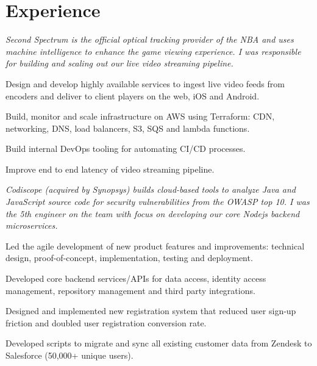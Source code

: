\documentclass[letterpaper]{deedy-resume} %
\begin{document}
\begin{minipage}[t]{0.66\textwidth} %


\section{Experience}

\textit{Second Spectrum is the official optical tracking provider of the NBA and uses machine intelligence to enhance the game viewing experience. I was responsible for building and scaling out our live video streaming pipeline.}
\vspace{3.5mm}
\begin{tightitemize}
\item Design and develop highly available services to ingest live video feeds from encoders and deliver to client players on the web, iOS and Android.
\item Build, monitor and scale infrastructure on AWS using Terraform: CDN, networking, DNS, load balancers, S3, SQS and lambda functions.
\item Build internal DevOps tooling for automating CI/CD processes.
\item Improve end to end latency of video streaming pipeline.
\end{tightitemize}

\sectionspace %


\textit{Codiscope (acquired by Synopsys) builds cloud-based tools to analyze Java and JavaScript source code for security vulnerabilities from the OWASP top 10. I was the 5th engineer on the team with focus on developing our core Nodejs backend microservices.}
\vspace{1.0mm} %
\begin{tightitemize}
\item Led the agile development of new product features and improvements: technical design, proof-of-concept, implementation, testing and deployment.
\item Developed core backend services/APIs for data access, identity access management, repository management and third party integrations.
\item Designed and implemented new registration system that reduced user sign-up friction and doubled user registration conversion rate.
\item Developed scripts to migrate and sync all existing customer data from Zendesk to Salesforce (50,000+ unique users).
\end{tightitemize}


\end{minipage}
\end{document}
